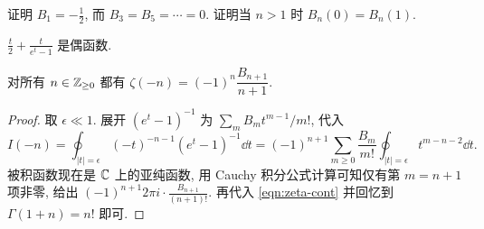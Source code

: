 \begin{exercise}
	证明 $B_1 = -\frac{1}{2}$, 而 $B_3 = B_5 = \cdots = 0$. 证明当 $n > 1$ 时 $B_n(0)=B_n(1)$.
	
	\begin{hint} $\frac{t}{2} + \frac{t}{e^t - 1}$ 是偶函数. \end{hint}
\end{exercise}

\begin{corollary}\label{prop:zeta-negative}
	对所有 $n \in \mathbb{Z}_{\geq 0}$ 都有 $\zeta(-n) = (-1)^n \dfrac{B_{n+1}}{n+1}$.
\end{corollary}
\begin{proof}
	取 $\epsilon \ll 1$. 展开 $(e^t-1)^{-1}$ 为 $\sum_m B_m t^{m-1}/m!$, 代入
	\[ I(-n) = \oint_{|t|=\epsilon} (-t)^{-n-1}(e^t -1)^{-1} \dd t = (-1)^{n+1} \sum_{m \geq 0} \frac{B_m}{m!} \oint_{|t|=\epsilon} t^{m-n-2} \dd t. \]
	被积函数现在是 $\mathbb{C}$ 上的亚纯函数, 用 Cauchy 积分公式计算可知仅有第 $m=n+1$ 项非零, 给出 $(-1)^{n+1} 2\pi i \cdot \frac{B_{n+1}}{(n+1)!}$. 再代入 \eqref{eqn:zeta-cont} 并回忆到 $\Gamma(1+n)=n!$ 即可.
\end{proof}


